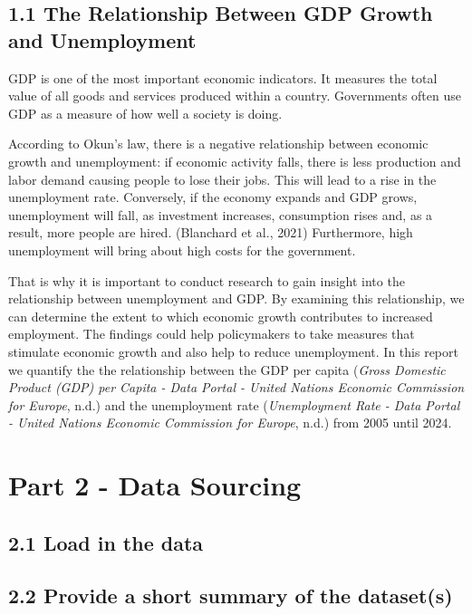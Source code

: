 \documentclass[
]{article}
\begin{document}
\subsection{1.1 The Relationship Between GDP Growth and
Unemployment}\label{the-relationship-between-gdp-growth-and-unemployment}

GDP is one of the most important economic indicators. It measures the
total value of all goods and services produced within a country.
Governments often use GDP as a measure of how well a society is doing.

According to Okun's law, there is a negative relationship between
economic growth and unemployment: if economic activity falls, there is
less production and labor demand causing people to lose their jobs. This
will lead to a rise in the unemployment rate. Conversely, if the economy
expands and GDP grows, unemployment will fall, as investment increases,
consumption rises and, as a result, more people are hired. (Blanchard et
al., 2021) Furthermore, high unemployment will bring about high costs
for the government.

That is why it is important to conduct research to gain insight into the
relationship between unemployment and GDP. By examining this
relationship, we can determine the extent to which economic growth
contributes to increased employment. The findings could help
policymakers to take measures that stimulate economic growth and also
help to reduce unemployment. In this report we quantify the the
relationship between the GDP per capita (\emph{Gross Domestic Product
(GDP) per Capita - Data Portal - United Nations Economic Commission for
Europe}, n.d.) and the unemployment rate (\emph{Unemployment Rate - Data
Portal - United Nations Economic Commission for Europe}, n.d.) from 2005
until 2024.\\

\section{Part 2 - Data Sourcing}\label{part-2---data-sourcing}

\subsection{2.1 Load in the data}\label{load-in-the-data}

\subsection{2.2 Provide a short summary of the
dataset(s)}\label{provide-a-short-summary-of-the-datasets}
\end{document}
